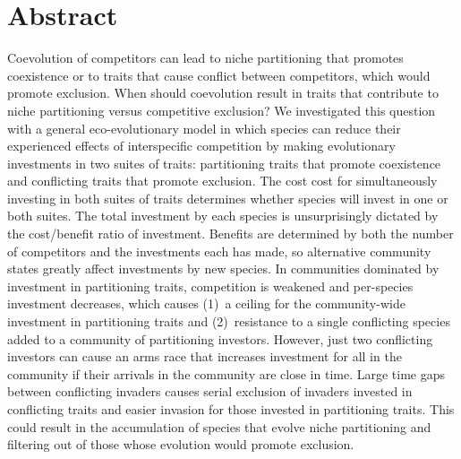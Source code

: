 \section*{Abstract}



Coevolution of competitors can lead to niche partitioning that 
promotes coexistence or to traits that cause conflict between competitors, 
which would promote exclusion.
When should coevolution result in traits that contribute to niche 
partitioning versus competitive exclusion? 
We investigated this question with a general eco-evolutionary model in 
which species can reduce their experienced effects of interspecific 
competition by making evolutionary investments in two suites of traits: 
partitioning traits that promote coexistence and 
conflicting traits that promote exclusion.
The cost cost for simultaneously investing in both suites of traits
determines whether species will invest in one or both suites.
The total investment by each species is unsurprisingly dictated by 
the cost/benefit ratio of investment. Benefits are determined by both 
the number of competitors and the investments each has made, so 
alternative community states greatly affect investments by new species. 
In communities dominated by investment in partitioning traits, 
competition is weakened and per-species investment decreases, 
which causes
(1)~a ceiling for the community-wide investment in partitioning traits and
(2)~resistance to a single conflicting species added to a community of
partitioning investors.
However, just two conflicting investors can cause an arms race
that increases investment for all in the community if their arrivals in
the community are close in time.
Large time gaps between conflicting invaders causes serial exclusion of 
invaders invested in conflicting traits and easier invasion for those
invested in partitioning traits.
This could result in the accumulation of species that evolve niche partitioning
and filtering out of those whose evolution would promote exclusion.
